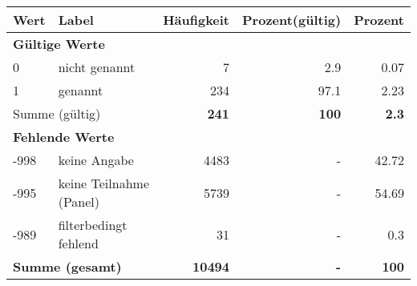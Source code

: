      \begin{longtable}{lXrrr}
     \toprule
     \textbf{Wert} & \textbf{Label} & \textbf{Häufigkeit} & \textbf{Prozent(gültig)} & \textbf{Prozent} \\
     \endhead
     \midrule
     \multicolumn{5}{l}{\textbf{Gültige Werte}}\\

     0 &
     \multicolumn{1}{X}{ nicht genannt   } &


       \num{7} &
       \num[round-mode=places,round-precision=2]{2,9} &
         \num[round-mode=places,round-precision=2]{0,07} \\

     1 &
     \multicolumn{1}{X}{ genannt   } &


       \num{234} &
       \num[round-mode=places,round-precision=2]{97,1} &
         \num[round-mode=places,round-precision=2]{2,23} \\
     \midrule
     \multicolumn{2}{l}{Summe (gültig)} &
       \textbf{\num{241}} &
     \textbf{100} &
       \textbf{\num[round-mode=places,round-precision=2]{2,3}} \\
     \multicolumn{5}{l}{\textbf{Fehlende Werte}}\\
       -998 &
       keine Angabe &
         \num{4483} &
        - &
         \num[round-mode=places,round-precision=2]{42,72} \\
       -995 &
       keine Teilnahme (Panel) &
         \num{5739} &
        - &
         \num[round-mode=places,round-precision=2]{54,69} \\
       -989 &
       filterbedingt fehlend &
         \num{31} &
        - &
         \num[round-mode=places,round-precision=2]{0,3} \\
     \midrule
     \multicolumn{2}{l}{\textbf{Summe (gesamt)}} &
          \textbf{\num{10494}} &
        \textbf{-} &
        \textbf{100} \\
     \bottomrule
     \end{longtable}
     
